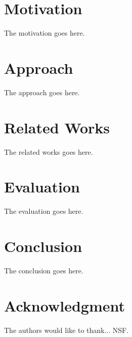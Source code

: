\documentclass[conference]{IEEEtran}
\begin{document}



\section{Motivation}
The motivation goes here.

\section{Approach}
The approach goes here.

\section{Related Works}
The related works goes here.

\section{Evaluation}
The evaluation goes here.

\section{Conclusion}
The conclusion goes here.

\section*{Acknowledgment}
The authors would like to thank... NSF.
\\



\end{document}
